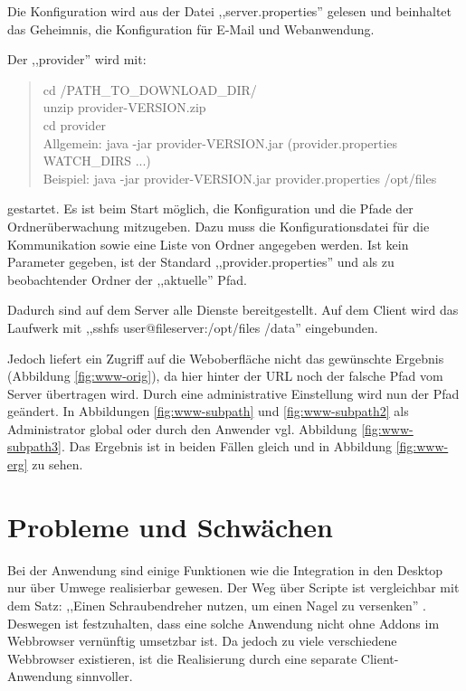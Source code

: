 \documentclass[oneside, ngerman, toc=bibliography,bibliography=totoc,listof=entryprefix, open=right,numbers=noenddot,fontsize=12pt]{scrbook}
\begin{document}
Die Konfiguration wird aus der Datei ,,server.properties'' gelesen und beinhaltet das Geheimnis, die Konfiguration für E-Mail und Webanwendung.

\bigskip

Der ,,provider'' wird mit:
\begin{quote}
    
    cd /PATH\_TO\_DOWNLOAD\_DIR/ \\
    unzip provider-VERSION.zip \\
    cd provider \\
    Allgemein: java -jar provider-VERSION.jar (provider.properties WATCH\_DIRS ...)\\
    Beispiel: java -jar provider-VERSION.jar provider.properties /opt/files
\end{quote}

gestartet. Es ist beim Start möglich, die Konfiguration und die Pfade der Ordnerüberwachung mitzugeben. Dazu muss die Konfigurationsdatei für die Kommunikation sowie eine Liste von Ordner angegeben werden. Ist kein Parameter gegeben, ist der Standard ,,provider.properties'' und als zu beobachtender Ordner der ,,aktuelle'' Pfad.


Dadurch sind auf dem Server alle Dienste bereitgestellt.
Auf dem Client wird das Laufwerk mit ,,sshfs user@fileserver:/opt/files /data'' eingebunden.

Jedoch liefert ein Zugriff auf die Weboberfläche nicht das gewünschte Ergebnis (Abbildung \ref{fig:www-orig}), da hier hinter der URL noch der falsche Pfad vom Server übertragen wird. Durch eine administrative Einstellung wird nun der Pfad geändert. In Abbildungen \ref{fig:www-subpath} und \ref{fig:www-subpath2} als Administrator global oder durch den Anwender vgl. Abbildung \ref{fig:www-subpath3}. Das Ergebnis ist in beiden Fällen gleich und in Abbildung \ref{fig:www-erg} zu sehen.



\section{Probleme und Schwächen}

Bei der Anwendung sind einige Funktionen wie die Integration in den Desktop nur über Umwege realisierbar gewesen. Der Weg über Scripte ist vergleichbar mit dem Satz:
,,Einen Schraubendreher nutzen, um einen Nagel zu versenken'' \cite{cederholm2009web}. Deswegen ist festzuhalten, dass eine solche Anwendung nicht ohne Addons im Webbrowser vernünftig umsetzbar ist. Da jedoch zu viele verschiedene Webbrowser existieren, ist die Realisierung durch eine separate Client-Anwendung sinnvoller.
\end{document}
